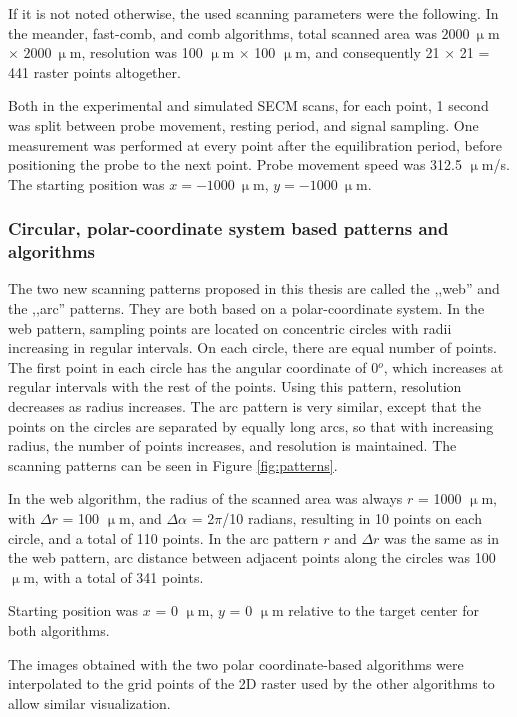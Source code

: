If it is not noted otherwise, the used scanning parameters were the following. In the meander, fast-comb, and comb algorithms, total scanned area was $2000~\upmu$m $\times$ $2000~\upmu$m, resolution was 100 $\upmu$m $\times$ 100 $\upmu$m, and consequently 21 $\times$ 21 = 441 raster points altogether. 
 
Both in the experimental and simulated SECM scans, for each point, 1 second was split between probe movement, resting period, and signal sampling.
One measurement was performed at every point after the equilibration period, before positioning the probe to the next point.
Probe movement speed was 312.5 $\upmu$m/s.
The starting position was $x = -1000~\upmu$m, $y = -1000~\upmu$m.

			\subsubsection{Circular, polar-coordinate system based patterns and algorithms}
The two new scanning patterns proposed in this thesis are called the ,,web'' and the ,,arc'' patterns.
They are both based on a polar-coordinate system.
In the web pattern, sampling points are located on concentric circles with radii increasing in regular intervals.
On each circle, there are equal number of points.
The first point in each circle has the angular coordinate of 0$^{o}$, which increases at regular intervals with the rest of the points.
Using this pattern, resolution decreases as radius increases.
The arc pattern is very similar, except that the points on the circles are separated by equally long arcs, so that with increasing radius, the number of points increases, and resolution is maintained.
The scanning patterns can be seen in Figure \ref{fig:patterns}.

In the web algorithm, the radius of the scanned area was always $r$ = 1000 $\upmu$m, with $\Delta r$ = 100 $\upmu$m, and $\Delta \alpha$ = 2$\pi$/10 radians, resulting in 10 points on each circle, and a total of 110 points.
In the arc pattern $r$ and $\Delta r$ was the same as in the web pattern, arc distance between adjacent points along the circles was 100 $\upmu$m, with a total of 341 points.

Starting position was $x$ = 0 $\upmu$m, $y$ = 0 $\upmu$m relative to the target center for both algorithms.

The images obtained with the two polar coordinate-based algorithms were interpolated to the grid points of the 2D raster used by the other algorithms to allow similar visualization.


